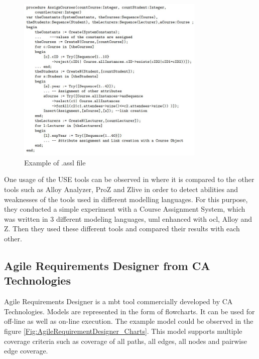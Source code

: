 \begin{figure} [htbp!]
	\centering
					\includegraphics[width=0.8\textwidth]{figures/USE_test_generation.JPG}
					\caption{\label{Fig:USE_test_generation} Example of .assl file \cite{USE_Alloy_Z_comparison}}
\end{figure}

\par
One usage of the USE tools can be observed in \cite{USE_Alloy_Z_comparison} where it is compared to the other tools such as Alloy Analyzer, ProZ and Zlive in order to detect abilities and weaknesses of the tools used in different modelling languages. For this purpose, they conducted a simple experiment with a Course Assignment System, which was written in 3 different modeling languages, \acrshort{uml} enhanced with \acrshort{ocl}, Alloy and Z. Then they used these different tools and compared their results with each other.

\subsection{Agile Requirements Designer from CA Technologies}
\par
Agile Requirements Designer is a \acrshort{mbt} tool commercially developed by CA Technologies\cite{Agile_Requirement_Designer_desciption}. Models are represented in the form of flowcharts. It can be used for off-line as well as on-line execution. The example model could be observed in the figure \ref{Fig:AgileRequirementDesigner_Charts}. This model supports multiple coverage criteria such as coverage of all paths, all edges, all nodes and pairwise edge coverage.


